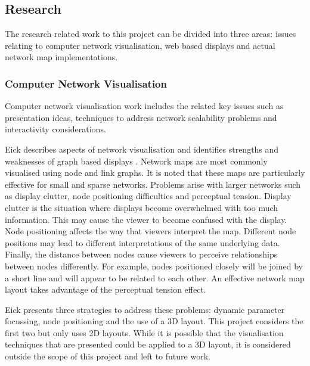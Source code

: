 \documentclass[11pt, a4paper]{article}
\begin{document}
\subsection{Research}
\label{sec:research}

The research related work to this project can be divided into three areas:
issues relating to computer network visualisation, web based displays and actual
network map implementations. 

\subsubsection{Computer Network Visualisation}
\label{sec:computer-network-vis}

Computer network visualisation work includes the related key issues such as
presentation ideas, techniques to address network scalability problems and
interactivity considerations.

Eick describes aspects of network visualisation and identifies strengths and
weaknesses of graph based displays \cite{Eick_1996}. Network maps are most
commonly visualised using node and link graphs. It is noted that these maps are
particularly effective for small and sparse networks. Problems arise with larger
networks such as display clutter, node positioning difficulties and perceptual
tension. Display clutter is the situation where displays become overwhelmed with
too much information. This may cause the viewer to become confused with the
display. Node positioning affects the way that viewers interpret the map.
Different node positions may lead to different interpretations of the same
underlying data. Finally, the distance between nodes cause viewers to perceive
relationships between nodes differently. For example, nodes positioned closely
will be joined by a short line and will appear to be related to each other. An
effective network map layout takes advantage of the perceptual tension effect.

Eick presents three strategies to address these problems: dynamic
parameter focussing, node positioning and the use of a 3D layout. This project
considers the first two but only uses 2D layouts. While it is possible that the
visualisation techniques that are presented could be applied to a 3D layout, it
is considered outside the scope of this project and left to future work.
\end{document}

